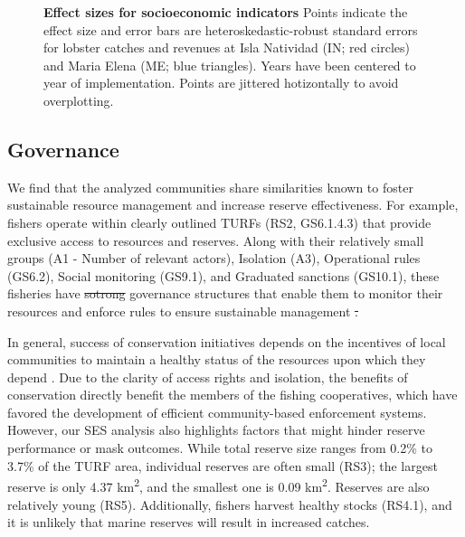 \documentclass[10pt,letterpaper]{article}
\providecommand{\DIFaddtex}[1]{{\protect\color{blue}\uwave{#1}}} %
\providecommand{\DIFdeltex}[1]{{\protect\color{red}\sout{#1}}}                      %
\providecommand{\DIFaddbegin}{} %
\providecommand{\DIFaddend}{} %
\providecommand{\DIFdelbegin}{} %
\providecommand{\DIFdelend}{} %
\providecommand{\DIFadd}[1]{\texorpdfstring{\DIFaddtex{#1}}{#1}} %
\providecommand{\DIFdel}[1]{\texorpdfstring{\DIFdeltex{#1}}{}} %
\newcommand{\DIFscaledelfig}{0.5}
\newlength{\DIFdelgraphicswidth} %
\newlength{\DIFdelgraphicsheight} %
\newcommand{\DIFaddincludegraphics}[2][]{{\color{blue}\fbox{\DIFOincludegraphics[#1]{#2}}}} %
\newcommand{\DIFdelincludegraphics}[2][]{%
\sbox{\DIFdelgraphicsbox}{\DIFOincludegraphics[#1]{#2}}%
\settoboxwidth{\DIFdelgraphicswidth}{\DIFdelgraphicsbox} %
\settoboxtotalheight{\DIFdelgraphicsheight}{\DIFdelgraphicsbox} %
\scalebox{\DIFscaledelfig}{%
\parbox[b]{\DIFdelgraphicswidth}{\usebox{\DIFdelgraphicsbox}\\[-\baselineskip] \rule{\DIFdelgraphicswidth}{0em}}\llap{\resizebox{\DIFdelgraphicswidth}{\DIFdelgraphicsheight}{%
\setlength{\unitlength}{\DIFdelgraphicswidth}%
\begin{picture}(1,1)%
\thicklines\linethickness{2pt} %
{\color[rgb]{1,0,0}\put(0,0){\framebox(1,1){}}}%
{\color[rgb]{1,0,0}\put(0,0){\line( 1,1){1}}}%
{\color[rgb]{1,0,0}\put(0,1){\line(1,-1){1}}}%
\end{picture}%
}\hspace*{3pt}}} %
} %
\DeclareRobustCommand{\DIFaddbegin}{\DIFOaddbegin \let\includegraphics\DIFaddincludegraphics} %
\DeclareRobustCommand{\DIFaddend}{\DIFOaddend \let\includegraphics\DIFOincludegraphics} %
\DeclareRobustCommand{\DIFdelbegin}{\DIFOdelbegin \let\includegraphics\DIFdelincludegraphics} %
\DeclareRobustCommand{\DIFdelend}{\DIFOaddend \let\includegraphics\DIFOincludegraphics} %
\begin{document}
\begin{figure}[!h]
\centering
\caption{{\bf Effect sizes for socioeconomic indicators}
Points indicate the effect size and error bars are heteroskedastic-robust standard errors for lobster catches and revenues at Isla Natividad (IN; red circles) and Maria Elena (ME; blue triangles). Years have been centered to year of implementation. Points are jittered hotizontally to avoid overplotting.}
\label{fig:lobsters}
\end{figure}

\subsection*{Governance}

We find that the analyzed communities share similarities known to foster sustainable resource management and increase reserve effectiveness. For example, fishers operate within clearly outlined TURFs (RS2, GS6.1.4.3) that provide exclusive access to resources and reserves. Along with their relatively small groups (A1 - Number of relevant actors), Isolation (A3), Operational rules (GS6.2), Social monitoring (GS9.1), and Graduated sanctions (GS10.1), these fisheries have \DIFdelbegin \DIFdel{sotrong }\DIFdelend \DIFaddbegin \DIFadd{strong }\DIFaddend governance structures that enable them to monitor their resources and enforce rules to ensure sustainable management \DIFdelbegin \DIFdel{. }\DIFdelend \DIFaddbegin \DIFadd{\mbox{%
\cite{mccay_2014,ayer_2018}}\hspace{0pt}%
.
}

\DIFaddend In general, success of conservation initiatives depends on the incentives of local communities to maintain a healthy status of the resources upon which they depend \cite{jupiter_2017}. Due to the clarity of access rights and isolation, the benefits of conservation directly benefit the members of the fishing cooperatives, which have favored the development of efficient community-based enforcement systems. However, our SES analysis also highlights factors that might hinder reserve performance or mask outcomes. While total reserve size ranges from 0.2\% to 3.7\% of the TURF area, individual reserves are often small (RS3); the largest reserve is only 4.37 km\textsuperscript{2}, and the smallest one is 0.09 km\textsuperscript{2}. Reserves are also relatively young (RS5). Additionally, fishers harvest healthy stocks (RS4.1), and it is unlikely that marine reserves will result in increased catches.
\end{document}
